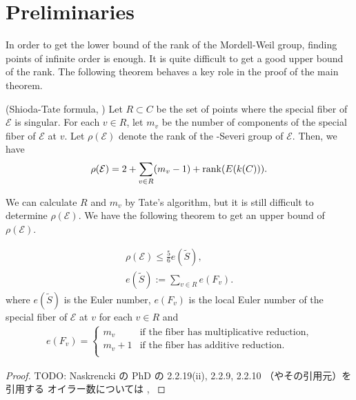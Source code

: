 \documentclass[main]{subfiles}
\begin{document}
\section{Preliminaries}

In order to get the lower bound of the rank of the Mordell-Weil group, finding points of infinite order is enough.
It is quite difficult to get a good upper bound of the rank.
The following theorem behaves a key role in the proof of the main theorem.
\begin{thm}{(Shioda-Tate formula, \cite[Corollary 5.3]{ref:shioda1990})}
    \label{thm:shioda}
    Let $R \subset C$ be the set of points where the special fiber of $\mathcal{E}$ is singular.
    For each $v \in R$, let $m_{v}$ be the number of components of the special fiber of $\mathcal{E}$ at $v$.
    Let $\rho(\mathcal{E})$ denote the rank of the \Neron-Severi group of $\mathcal{E}$.
    Then, we have
    \begin{equation*}
        \rho (\mathcal{E}) = 2 + \sum_{v \in R} (m_{v} - 1) + \operatorname{rank}(E(k(C))).
    \end{equation*}
\end{thm}

We can calculate $R$ and $m_{v}$ by Tate's algorithm, but it is still difficult to determine $\rho(\mathcal{E})$.
We have the following theorem to get an upper bound of $\rho(\mathcal{E})$.

\begin{thm}
    \label{thm:rho}
    \begin{align*}
        \rho(\mathcal{E}) \leq \frac{5}{6} e(\tilde{S}), \\
        e(\tilde{S}) := \sum_{v \in R} e(F_{v}).
    \end{align*}
    where $e(\tilde{S})$ is the Euler number, $e(F_{v})$ is the local Euler number of the special fiber of $\mathcal{E}$ at $v$ for each $v \in R$ and
    \begin{align*}
        e(F_{v}) = \begin{cases}
                       m_v     & \text{if the fiber has multiplicative reduction}, \\
                       m_v + 1 & \text{if the fiber has additive reduction}.       \\
                   \end{cases}
    \end{align*}
\end{thm}
\begin{proof}
    TODO: Naskrencki の PhD の 2.2.19(ii), 2.2.9, 2.2.10 （やその引用元）を引用する
    オイラー数については \cite[pp. 136-137 付録2]{ref:shioda1993}, \cite[p.14 Table II]{ref:kodaira1963-3}
\end{proof}
\end{document}
